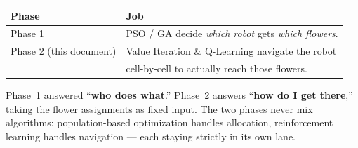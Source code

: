 \documentclass[11pt]{article}
\begin{document}
\begin{center}
\begin{tabular}{@{}ll@{}}
\toprule
\textbf{Phase} & \textbf{Job} \\
\midrule
Phase 1 & PSO / GA decide \emph{which robot} gets \emph{which flowers}. \\
Phase 2 (this document) & Value Iteration \& Q-Learning navigate the robot \\
                        & cell-by-cell to actually reach those flowers. \\
\bottomrule
\end{tabular}
\end{center}

\noindent
Phase~1 answered ``\textbf{who does what}.'' Phase~2 answers ``\textbf{how do I
get there},'' taking the flower assignments as fixed input. The two phases never
mix algorithms: population-based optimization handles allocation, reinforcement
learning handles navigation --- each staying strictly in its own lane.
\end{document}
